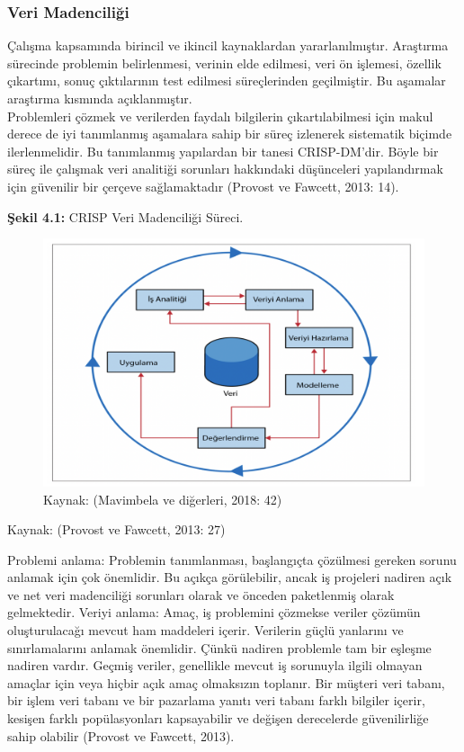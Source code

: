\documentclass[
]{book}
\begin{document}
\hypertarget{veri-madenciliux11fi}{%
\subsubsection{Veri Madenciliği}\label{veri-madenciliux11fi}}

Çalışma kapsamında birincil ve ikincil kaynaklardan yararlanılmıştır. Araştırma sürecinde problemin belirlenmesi, verinin elde edilmesi, veri ön işlemesi, özellik çıkartımı, sonuç çıktılarının test edilmesi süreçlerinden geçilmiştir. Bu aşamalar araştırma kısmında açıklanmıştır.\\
Problemleri çözmek ve verilerden faydalı bilgilerin çıkartılabilmesi için makul derece de iyi tanımlanmış aşamalara sahip bir süreç izlenerek sistematik biçimde ilerlenmelidir. Bu tanımlanmış yapılardan bir tanesi CRISP-DM'dir. Böyle bir süreç ile çalışmak veri analitiği sorunları hakkındaki düşünceleri yapılandırmak için güvenilir bir çerçeve sağlamaktadır (Provost ve Fawcett, 2013: 14).

\textbf{Şekil 4.1:} CRISP Veri Madenciliği Süreci.

\begin{figure}
\includegraphics[width=0.95\linewidth,height=0.95\textheight]{tablolar-sekiller/sekil-4-1} \caption{Kaynak: (Mavimbela ve diğerleri, 2018: 42)}\label{fig:unnamed-chunk-1}
\end{figure}

Kaynak: (Provost ve Fawcett, 2013: 27)

Problemi anlama: Problemin tanımlanması, başlangıçta çözülmesi gereken sorunu anlamak için çok önemlidir. Bu açıkça görülebilir, ancak iş projeleri nadiren açık ve net veri madenciliği sorunları olarak ve önceden paketlenmiş olarak gelmektedir.
Veriyi anlama: Amaç, iş problemini çözmekse veriler çözümün oluşturulacağı mevcut ham maddeleri içerir. Verilerin güçlü yanlarını ve sınırlamalarını anlamak önemlidir. Çünkü nadiren problemle tam bir eşleşme nadiren vardır. Geçmiş veriler, genellikle mevcut iş sorunuyla ilgili olmayan amaçlar için veya hiçbir açık amaç olmaksızın toplanır. Bir müşteri veri tabanı, bir işlem veri tabanı ve bir pazarlama yanıtı veri tabanı farklı bilgiler içerir, kesişen farklı popülasyonları kapsayabilir ve değişen derecelerde güvenilirliğe sahip olabilir (Provost ve Fawcett, 2013).
\end{document}
